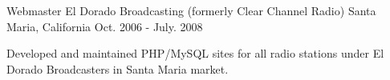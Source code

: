 \begin{cventries}
  \cventry
    {Webmaster} %
    {El Dorado Broadcasting (formerly Clear Channel Radio)} %
    {Santa Maria, California} %
    {Oct. 2006 - July. 2008} %
    {
      \begin{cvitems} %
        \item {Developed and maintained PHP/MySQL sites for all radio stations under El Dorado Broadcasters in Santa Maria market.}
      \end{cvitems}
    }



\end{cventries}
